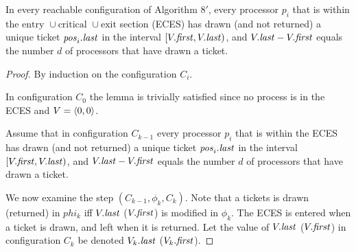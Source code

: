 \begin{lemma} \label{lemma:3.0bounded}
In every reachable configuration of Algorithm $8'$, every processor $p_i$
that is within the $\text{entry } \cup \text{critical } \cup \text{exit}$
section (ECES) has drawn (and not returned) a unique ticket $\mathit{pos}_i.\mathit{last}$ in the
interval $[V.\mathit{first}, V.\mathit{last})$, and $V.\mathit{last} - V.\mathit{first}$ equals the number
$d$ of processors that have drawn a ticket.
\end{lemma}

\begin{proof}
By induction on the configuration $C_i$.

In configuration $C_0$ the lemma is trivially satisfied since no process is in
the ECES and $V = \langle 0, 0 \rangle$.

Assume that in configuration $C_{k-1}$ every processor $p_i$
that is within the ECES has drawn (and not returned) a unique ticket $\mathit{pos}_i.\mathit{last}$ in the
interval $[V.\mathit{first}, V.\mathit{last})$, and $V.\mathit{last} - V.\mathit{first}$ equals the number
$d$ of processors that have drawn a ticket.

We now examine the step $(C_{k-1}, \phi_k, C_k)$. Note that a tickets is
drawn (returned) in $phi_k$ iff $V.\mathit{last}$ ($V.\mathit{first}$) is modified in $\phi_k$.
The ECES is entered when a ticket is drawn, and left when it is returned.
Let the value of $V.\mathit{last}$ ($V.\mathit{first}$) in configuration $C_k$ be denoted
$V_k.\mathit{last}$ ($V_k.\mathit{first}$).


\end{proof}
